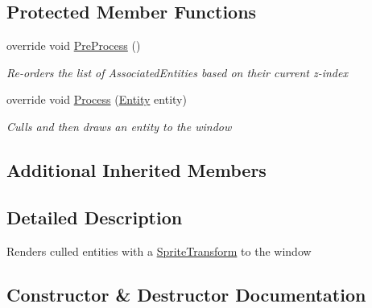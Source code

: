 \subsection*{Protected Member Functions}
\begin{DoxyCompactItemize}
\item 
override void \hyperlink{class_midnight_blue_1_1_engine_1_1_entity_component_1_1_render_system_a0c3d20164cc31ae45aa5e0814b08f08f}{Pre\+Process} ()
\begin{DoxyCompactList}\small\item\em Re-\/orders the list of Associated\+Entities based on their current z-\/index \end{DoxyCompactList}\item 
override void \hyperlink{class_midnight_blue_1_1_engine_1_1_entity_component_1_1_render_system_aca6ccedef98243f0de2b2d83daa9a2bd}{Process} (\hyperlink{class_midnight_blue_1_1_engine_1_1_entity_component_1_1_entity}{Entity} entity)
\begin{DoxyCompactList}\small\item\em Culls and then draws an entity to the window \end{DoxyCompactList}\end{DoxyCompactItemize}
\subsection*{Additional Inherited Members}


\subsection{Detailed Description}
Renders culled entities with a \hyperlink{class_midnight_blue_1_1_engine_1_1_entity_component_1_1_sprite_transform}{Sprite\+Transform} to the window 



\subsection{Constructor \& Destructor Documentation}
\hypertarget{class_midnight_blue_1_1_engine_1_1_entity_component_1_1_render_system_a6783b38f3c1a2c8c6024499862bcc27e}{}\label{class_midnight_blue_1_1_engine_1_1_entity_component_1_1_render_system_a6783b38f3c1a2c8c6024499862bcc27e} 
